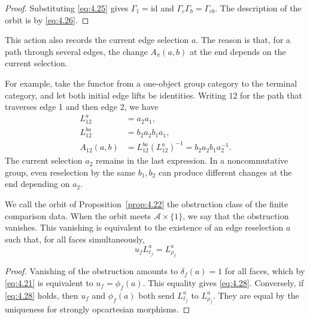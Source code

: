 \begin{proof}

Substituting \eqref{eq:4.25} gives $\Gamma_1=\mathrm{id}$ and
$\Gamma_c\Gamma_b=\Gamma_{cb}$.
The description of the orbit is by \eqref{eq:4.26}.

\end{proof}

This action also records the current edge selection $a$.
The reason is that, for a path through several edges, the change $A_\pi(a,b)$ at the end
depends on the current selection.

For example, take the functor from a one-object group category to the terminal
category, and let both initial edge lifts be identities.
Writing $12$ for the path that traverses edge 1 and then edge 2, we have
\[
\begin{aligned}
L_{12}^{a}&=a_2a_1,\\
L_{12}^{ba}&=b_2a_2b_1a_1,\\
A_{12}(a,b)&=L_{12}^{ba}(L_{12}^{a})^{-1}
=b_2a_2b_1a_2^{-1}.
\end{aligned}
\]
The current selection $a_2$ remains in the last expression.
In a noncommutative group, even reselection by the same $b_1,b_2$ can produce
different changes at the end depending on $a_2$.

\begin{theorem}\label{thm:4.23}

We call the orbit of Proposition~\ref{prop:4.22} the obstruction class of the finite
comparison data.
When the orbit meets $\mathcal{A}\times\{1\}$, we say that the obstruction vanishes.
This vanishing is equivalent to the existence of an edge reselection $a$ such that, for
all faces simultaneously,
\begin{equation*}
u_fL_{\ell_f}^a=L_{\rho_f}^a
\tag{4.28}\label{eq:4.28}
\end{equation*}
\end{theorem}

\begin{proof}

Vanishing of the obstruction amounts to $\delta_f(a)=1$ for all faces, which by
\eqref{eq:4.21} is equivalent to $u_f=\phi_f(a)$.
This equality gives \eqref{eq:4.28}.
Conversely, if \eqref{eq:4.28} holds, then $u_f$ and $\phi_f(a)$ both send
$L_{\ell_f}^a$ to $L_{\rho_f}^a$.
They are equal by the uniqueness for strongly opcartesian morphisms.

\end{proof}

